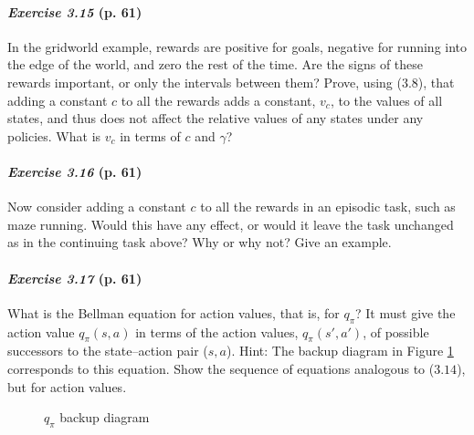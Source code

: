 \documentclass[10pt,a4paper]{article}
\begin{document}
\paragraph{\textit{Exercise 3.15} (p. 61)} In the gridworld example, rewards are positive for goals, negative for running into the edge of the world, and zero the rest of the time. Are the signs of these rewards important, or only the intervals between them? Prove, using ($3.8$), that adding a
constant $c$ to all the rewards adds a constant, $v_c$, to the values of all states, and thus does not affect the relative values of any states under any policies. What is $v_c$ in terms of $c$ and $\gamma$?

\paragraph{\textit{Exercise 3.16} (p. 61)} Now consider adding a constant $c$ to all the rewards in an episodic task, such as maze running. Would this have any effect, or would it leave the task unchanged as in the continuing task above? Why or why not? Give an example.

\paragraph{\textit{Exercise 3.17} (p. 61)} What is the Bellman equation for action values, that is, for $q_\pi$? It must give the action value $q_\pi(s, a)$ in terms of the action values, $q_\pi(s', a')$, of possible successors to the state–action pair ($s, a$).
Hint: The backup diagram in Figure  \ref{bellman_eq_action_val} corresponds to this equation.
Show the sequence of equations analogous to ($3.14$), but for action
values.


\begin{figure}[h]
\centering
{}
\caption{$q_\pi$ backup diagram}
\label{bellman_eq_action_val}
\end{figure}
\end{document}
